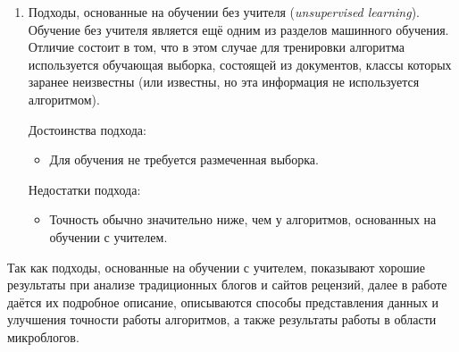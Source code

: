 \begin{enumerate}
\begin{itemize}
\end{itemize} 

\item 
Подходы, основанные на обучении без учителя (\textit{unsupervised learning}). 
Обучение без учителя является ещё одним из разделов машинного обучения. 
Отличие состоит в том, что в этом случае для тренировки алгоритма используется 
обучающая выборка, состоящей из документов, классы которых заранее 
неизвестны (или известны, но эта информация не используется алгоритмом).

Достоинства подхода:
\begin{itemize}

	\item
	Для обучения не требуется размеченная выборка. 

\end{itemize}

Недостатки подхода:
\begin{itemize}

	\item
	Точность обычно значительно ниже, чем у алгоритмов, основанных на обучении с учителем.

\end{itemize} 

\end{enumerate}

Так как подходы, основанные на обучении с учителем, 
показывают хорошие результаты при анализе традиционных 
блогов и сайтов рецензий, далее в работе даётся их подробное описание, 
описываются способы представления данных и улучшения точности  работы 
алгоритмов, а также результаты работы в области микроблогов.